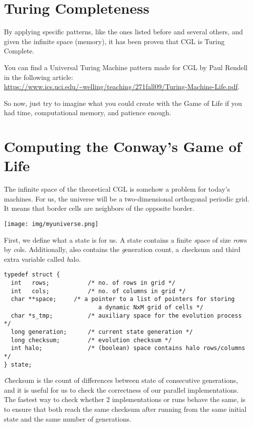\documentclass[a4paper,12pt,openany]{article}
\begin{document}
\section{Turing Completeness}

By applying specific patterns, like the ones listed before and several others, and given the infinite space (memory),
it has been proven that CGL is Turing Complete.

You can find a Universal Turing Machine pattern made for CGL by Paul Rendell in the following
article: \url{https://www.ics.uci.edu/~welling/teaching/271fall09/Turing-Machine-Life.pdf}.

So now, just try to imagine what you could create with the Game of Life if you had
time, computational memory, and patience enough.


\section{Computing the Conway's Game of Life}

The infinite space of the theoretical CGL is somehow a problem for today's machines.
For us, the universe will be a two-dimensional orthogonal periodic grid.
It means that border cells are neighbors of the opposite border.

\begin{center}
\texttt{[image: img/myuniverse.png]}
\end{center}

First, we define what a state is for us.
A state contains a finite {\emph space} of size {\emph rows} by {\emph cols}.
Additionally, also contains the {\emph generation} count,
a {\emph checksum} and third extra variable called {\emph halo}.

\begin{lstlisting}
typedef struct {
  int   rows;       	/* no. of rows in grid */
  int   cols;       	/* no. of columns in grid */
  char **space;    	/* a pointer to a list of pointers for storing
                     	   a dynamic NxM grid of cells */
  char *s_tmp;          /* auxiliary space for the evolution process */
  long generation;      /* current state generation */
  long checksum;        /* evolution checksum */
  int halo;             /* (boolean) space contains halo rows/columns */
} state;
\end{lstlisting}

{\emph Checksum} is the count of differences between state of consecutive generations,
and it is useful for us to check the correctness of our parallel implementations.
The fastest way to check whether 2 implementations or runs behave the same, is to
ensure that both reach the same checksum after running from the same initial state
and the same number of generations.
\end{document}

